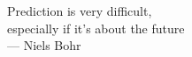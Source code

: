 
\thispagestyle{empty}


\vspace*{3cm}

\begin{center}
Prediction is very difficult,\\
especially if it's about the future\\\medskip
--- Niels Bohr
\end{center}
